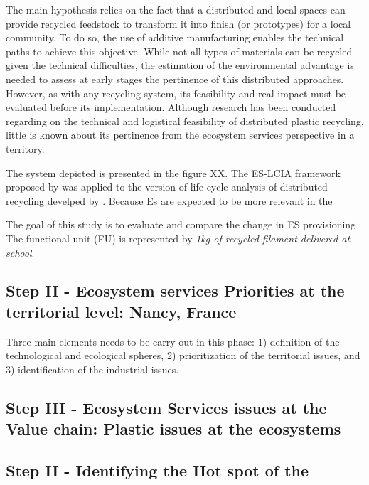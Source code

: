 \documentclass[
]{article}
\begin{document}
The main hypothesis relies on the fact that a distributed and local spaces can provide recycled feedstock to transform it into finish (or prototypes) for a local community.
To do so, the use of additive manufacturing enables the technical paths to achieve this objective.
While not all types of materials can be recycled given the technical difficulties, the estimation of the environmental advantage is needed to assess at early stages the pertinence of this distributed approaches.
However, as with any recycling system, its feasibility and real impact must be evaluated before its implementation.
Although research has been conducted regarding on the technical and logistical feasibility of distributed plastic recycling, little is known about its pertinence from the ecosystem services perspective in a territory.

The system depicted is presented in the figure XX.
The ES-LCIA framework proposed by was applied to the version of life cycle analysis of distributed recycling develped by .
Because Es are expected to be more relevant in the

The goal of this study is to evaluate and compare the change in ES provisioning
The functional unit (FU) is represented by \emph{1kg of recycled filament delivered at school}.

\hypertarget{step-ii---ecosystem-services-priorities-at-the-territorial-level-nancy-france}{%
\subsection{Step II - Ecosystem services Priorities at the territorial level: Nancy, France}\label{step-ii---ecosystem-services-priorities-at-the-territorial-level-nancy-france}}

Three main elements needs to be carry out in this phase: 1) definition of the technological and ecological spheres, 2) prioritization of the territorial issues, and 3) identification of the industrial issues.

\hypertarget{step-iii---ecosystem-services-issues-at-the-value-chain-plastic-issues-at-the-ecosystems}{%
\subsection{Step III - Ecosystem Services issues at the Value chain: Plastic issues at the ecosystems}\label{step-iii---ecosystem-services-issues-at-the-value-chain-plastic-issues-at-the-ecosystems}}

\hypertarget{step-ii---identifying-the-hot-spot-of-the}{%
\subsection{Step II - Identifying the Hot spot of the}\label{step-ii---identifying-the-hot-spot-of-the}}
\end{document}
